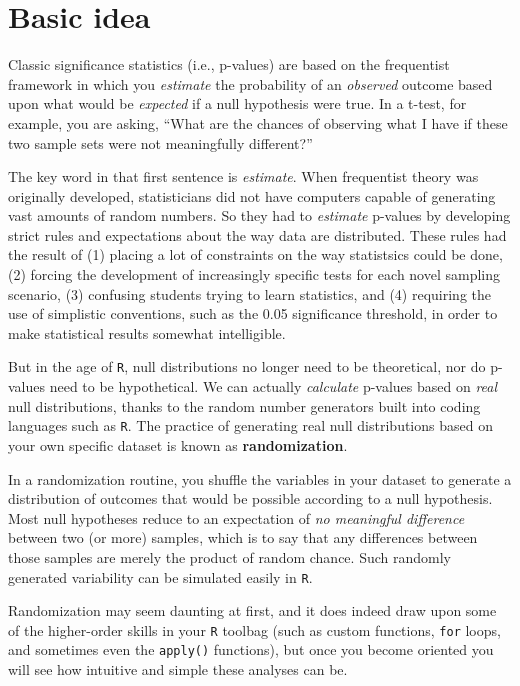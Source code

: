 \documentclass[
]{book}
\begin{document}
\hypertarget{basic-idea}{%
\section*{Basic idea}\label{basic-idea}}

Classic significance statistics (i.e., p-values) are based on the frequentist framework in which you \emph{estimate} the probability of an \emph{observed} outcome based upon what would be \emph{expected} if a null hypothesis were true. In a t-test, for example, you are asking, ``What are the chances of observing what I have if these two sample sets were not meaningfully different?''

The key word in that first sentence is \emph{estimate}. When frequentist theory was originally developed, statisticians did not have computers capable of generating vast amounts of random numbers. So they had to \emph{estimate} p-values by developing strict rules and expectations about the way data are distributed. These rules had the result of (1) placing a lot of constraints on the way statistsics could be done, (2) forcing the development of increasingly specific tests for each novel sampling scenario, (3) confusing students trying to learn statistics, and (4) requiring the use of simplistic conventions, such as the 0.05 significance threshold, in order to make statistical results somewhat intelligible.

But in the age of \texttt{R}, null distributions no longer need to be theoretical, nor do p-values need to be hypothetical. We can actually \emph{calculate} p-values based on \emph{real} null distributions, thanks to the random number generators built into coding languages such as \texttt{R}. The practice of generating real null distributions based on your own specific dataset is known as \textbf{randomization}.

In a randomization routine, you shuffle the variables in your dataset to generate a distribution of outcomes that would be possible according to a null hypothesis. Most null hypotheses reduce to an expectation of \emph{no meaningful difference} between two (or more) samples, which is to say that any differences between those samples are merely the product of random chance. Such randomly generated variability can be simulated easily in \texttt{R}.

Randomization may seem daunting at first, and it does indeed draw upon some of the higher-order skills in your \texttt{R} toolbag (such as custom functions, \texttt{for} loops, and sometimes even the \texttt{apply()} functions), but once you become oriented you will see how intuitive and simple these analyses can be.
\end{document}
